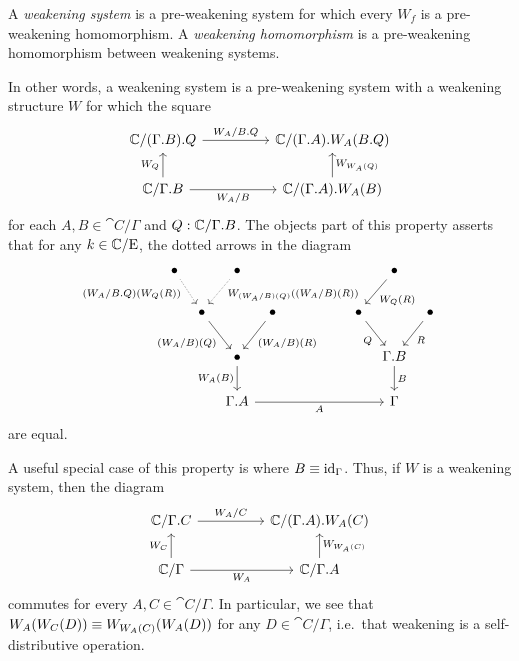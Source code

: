 \begin{defn}
A \emph{weakening system} is a pre-weakening system for which every $W_f$ is a
pre-weakening homomorphism. A \emph{weakening homomorphism} is a pre-weakening 
homomorphism between weakening systems.
\end{defn}

\begin{rmk}
In other words, a weakening system is a pre-weakening system with a weakening
structure $W$ for which the square
\begin{equation*}
\begin{tikzcd}[column sep=huge]
\cat{C}/\ctxext{{\Gamma}{B}}{Q}
  \arrow[r,"W_A/\ctxext{B}{Q}"]
  &
\cat{C}/\ctxext{{\Gamma}{A}}{W_A(\ctxext{B}{Q})}
  \\
\cat{C}/\ctxext{\Gamma}{B}
  \arrow[u,"W_Q"]
  \arrow[r,swap,"W_A/B"]
  &
\cat{C}/\ctxext{{\Gamma}{A}}{W_A(B)}
  \arrow[u,swap,"W_{W_A(Q)}"]
\end{tikzcd}
\end{equation*}
for each $A,B\in\cat{C}/\Gamma$ and $Q:\cat{C}/\ctxext{\Gamma}{B}$. The objects part of this 
property asserts that for any $k\in \mathbb{C}/\mathrm{E}$, the dotted arrows in the diagram
\begin{equation*}
\begin{tikzcd}[column sep=tiny]
\bullet \arrow[dr,densely dotted,swap,near start,"(W_A/\ctxext{B}{Q})(W_Q(R))"] & & \bullet \arrow[dl,densely dotted,near start,"W_{(W_A/B)(Q)}((W_A/B)(R))"] & & & & & & & & & & \bullet \arrow[dl,"W_Q(R)"] \\
& \bullet \arrow[dr,swap,"(W_A/B)(Q)"] & & \bullet \arrow[dl,"(W_A/B)(R)"] & & & & & & & & \bullet \arrow[dr,swap,"Q"] & & \bullet \arrow[dl,"R"] \\
& & \bullet \arrow[d,swap,"W_A(B)"] & & & & & & & & & & \ctxext{\Gamma}{B} \arrow[d,"B"] \\
& & \ctxext{\Gamma}{A} \arrow[rrrrrrrrrr,swap,"A"] & & & & & & & & & & \Gamma
\end{tikzcd}
\end{equation*}
are equal.

A useful special case of this property is where $B\equiv {\mathrm{id}_{\Gamma}}$. Thus, if $W$ is
a weakening system, then the diagram
\begin{equation*}
\begin{tikzcd}[column sep=huge]
\cat{C}/\ctxext{\Gamma}{C}
  \arrow[r,"W_A/C"]
  &
\cat{C}/\ctxext{{\Gamma}{A}}{W_A(C)}
  \\
\cat{C}/\Gamma
  \arrow[u,"W_C"]
  \arrow[r,swap,"W_A"]
  &
\cat{C}/\ctxext{\Gamma}{A}
  \arrow[u,swap,"W_{W_A(C)}"]
\end{tikzcd}
\end{equation*}
commutes for every $A,C\in\cat{C}/\Gamma$. In particular, we see
that $W_A(W_C(D))\equiv W_{W_A(C)}(W_A(D))$ for any $D\in\cat{C}/\Gamma$,
i.e.~that weakening is a self-distributive operation. 
\end{rmk}

